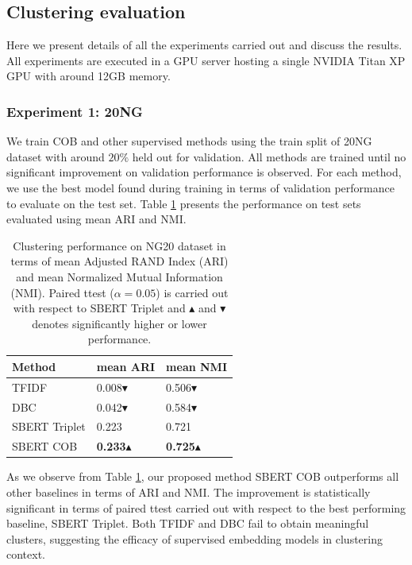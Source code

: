 \documentclass[11pt,a4paper]{article}
\begin{document}
\subsection{Clustering evaluation} Here we present details of all the experiments carried out and discuss the results. All experiments are executed in a GPU server hosting a single NVIDIA Titan XP GPU with around 12GB memory.

\subsubsection{Experiment 1: 20NG} We train COB and other supervised methods using the train split of 20NG dataset with around $20\%$ held out for validation. All methods are trained until no significant improvement on validation performance is observed. For each method, we use the best model found during training in terms of validation performance to evaluate on the test set. Table \ref{tab:ng20exp} presents the performance on test sets evaluated using mean ARI and NMI.

\begin{table}[h]
\caption{Clustering performance on NG20 dataset in terms of mean Adjusted RAND Index (ARI) and mean Normalized Mutual Information (NMI). Paired ttest ($\alpha=0.05$) is carried out with respect to SBERT Triplet and $\blacktriangle$ and $\blacktriangledown$ denotes significantly higher or lower performance.}
\label{tab:ng20exp}
\begin{tabular}{lll}
\hline
Method        & mean ARI & mean NMI \\ \hline
TFIDF         & 0.008$\blacktriangledown$ & 0.506$\blacktriangledown$ \\
DBC           & 0.042$\blacktriangledown$ & 0.584$\blacktriangledown$ \\
SBERT Triplet & 0.223 & 0.721 \\
SBERT COB     & \textbf{0.233}$\blacktriangle$ & \textbf{0.725}$\blacktriangle$        
\end{tabular}
\end{table}

As we observe from Table \ref{tab:ng20exp}, our proposed method SBERT COB outperforms all other baselines in terms of ARI and NMI. The improvement is statistically significant in terms of paired ttest carried out with respect to the best performing baseline, SBERT Triplet. Both TFIDF and DBC fail to obtain meaningful clusters, suggesting the efficacy of supervised embedding models in clustering context.
\end{document}
